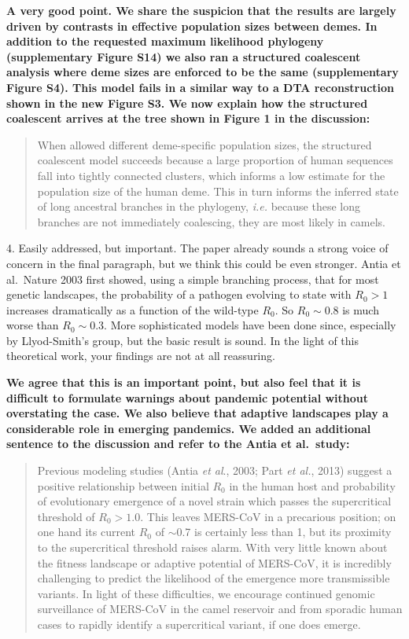 \documentclass[11pt,oneside,letterpaper]{article}
\begin{document}
\textbf{A very good point. We share the suspicion that the results are largely driven by contrasts in effective population sizes between demes. In addition to the requested maximum likelihood phylogeny (supplementary Figure S14) we also ran a structured coalescent analysis where deme sizes are enforced to be the same (supplementary Figure S4). This model fails in a similar way to a DTA reconstruction shown in the new Figure S3. We now explain how the structured coalescent arrives at the tree shown in Figure 1 in the discussion:}

\begin{quotation}
When allowed different deme-specific population sizes, the structured coalescent model succeeds because a large proportion of human sequences fall into tightly connected clusters, which informs a low estimate for the population size of the human deme.
This in turn informs the inferred state of long ancestral branches in the phylogeny, \textit{i.e.} because these long branches are not immediately coalescing, they are most likely in camels.
\end{quotation}

4. Easily addressed, but important. The paper already sounds a strong voice of concern in the final paragraph, but we think this could be even stronger. Antia et al.\ Nature 2003 first showed, using a simple branching process, that for most genetic landscapes, the probability of a pathogen evolving to state with $R_0>1$ increases dramatically as a function of the wild-type $R_0$. So $R_0\sim0.8$ is much worse than $R_0\sim0.3$. More sophisticated models have been done since, especially by Llyod-Smith's group, but the basic result is sound. In the light of this theoretical work, your findings are not at all reassuring.

\textbf{We agree that this is an important point, but also feel that it is difficult to formulate warnings about pandemic potential without overstating the case. We also believe that adaptive landscapes play a considerable role in emerging pandemics. We added an additional sentence to the discussion and refer to the Antia et al.\ study:}

\begin{quotation}
Previous modeling studies (Antia \textit{et al}., 2003; Part \textit{et al.}, 2013) suggest a positive relationship between initial $R_{0}$ in the human host and probability of evolutionary emergence of a novel strain which passes the supercritical threshold of $R_{0}>1.0$.
This leaves MERS-CoV in a precarious position; on one hand its current $R_{0}$ of $\sim$0.7 is certainly less than 1, but its proximity to the supercritical threshold raises alarm.
With very little known about the fitness landscape or adaptive potential of MERS-CoV, it is incredibly challenging to predict the likelihood of the emergence more transmissible variants.
In light of these difficulties, we encourage continued genomic surveillance of MERS-CoV in the camel reservoir and from sporadic human cases to rapidly identify a supercritical variant, if one does emerge.
\end{quotation}
\end{document}
